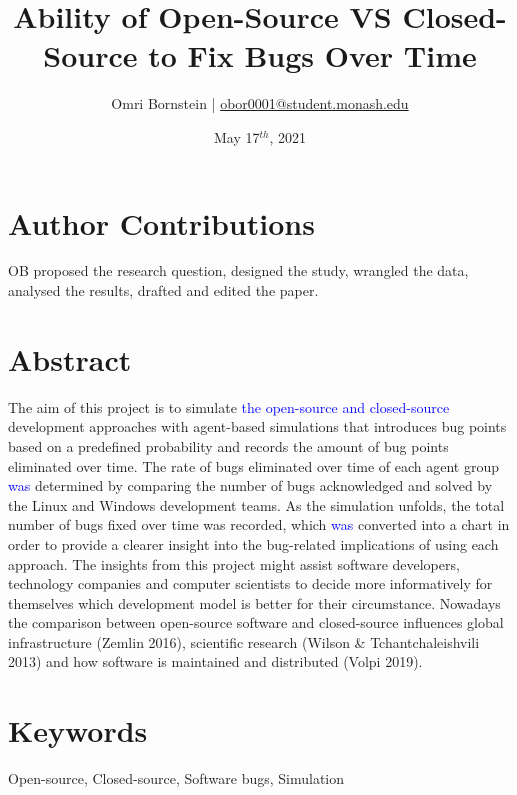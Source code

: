 \documentclass[10pt, a4paper, fleqn]{article}
\title{Ability of Open-Source VS Closed-Source to Fix Bugs Over Time}
\date{May 17$^{th}$, 2021}
\author{Omri Bornstein | \href{mailto:obor0001@student.monash.edu}{obor0001@student.monash.edu}}
\begin{document}
\maketitle
\section*{Author Contributions}
OB proposed the research question, designed the study, wrangled the data, analysed the results, drafted and edited the paper.
\section{Abstract}
The aim of this project is to simulate \textcolor{blue}{the open-source and closed-source} development approaches with agent-based simulations that introduces bug points based on a predefined probability and records the amount of bug points eliminated over time. The rate of bugs eliminated over time of each agent group \textcolor{blue}{was} determined by comparing the number of bugs acknowledged and solved by the Linux and Windows development teams. As the simulation unfolds, the total number of bugs fixed over time was recorded, which \textcolor{blue}{was} converted into a chart in order to provide a clearer insight into the bug-related implications of using each approach. The insights from this project might assist software developers, technology companies and computer scientists to decide more informatively for themselves which development model is better for their circumstance. Nowadays the comparison between open-source software and closed-source influences global infrastructure (Zemlin 2016), scientific research (Wilson \& Tchantchaleishvili 2013) and how software is maintained and distributed (Volpi 2019).
\section{Keywords}
Open-source, Closed-source, Software bugs, Simulation
\end{document}
